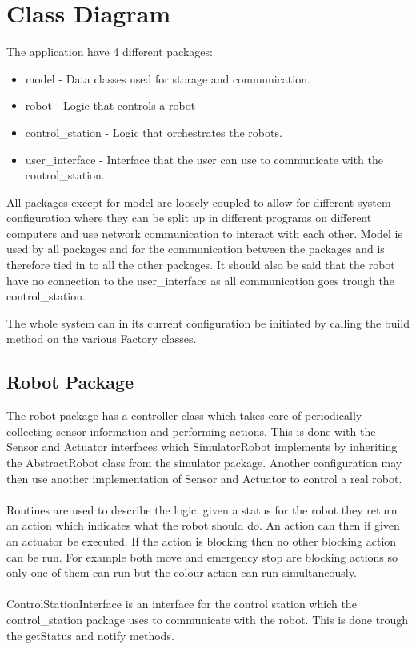 \section{Class Diagram}
The application have 4 different packages:
\begin{itemize}
    \item model - Data classes used for storage and communication.
    \item robot - Logic that controls a robot
    \item control\_station - Logic that orchestrates the robots.
    \item user\_interface - Interface that the user can use to communicate with the control\_station.
\end{itemize}
All packages except for model are loosely coupled to allow for different system configuration where they can be split up in different programs on different computers and use network communication to interact with each other. Model is used by all packages and for the communication between the packages and is therefore tied in to all the other packages. It should also be said that the robot have no connection to the user\_interface as all communication goes trough the control\_station.

The whole system can in its current configuration be initiated by calling the build method on the various Factory classes.

\subsection{Robot Package}
The robot package has a controller class which takes care of periodically collecting sensor information and performing actions. This is done with the Sensor and Actuator interfaces which SimulatorRobot implements by inheriting the AbstractRobot class from the simulator package. Another configuration may then use another implementation of Sensor and Actuator to control a real robot.
\\ \\
Routines are used to describe the logic, given a status for the robot they return an action which indicates what the robot should do. An action can then if given an actuator be executed. If the action is blocking then no other blocking action can be run. For example both move and emergency stop are blocking actions so only one of them can run but the colour action can run simultaneously.
\\ \\
ControlStationInterface is an interface for the control station which the control\_station package uses to communicate with the robot. This is done trough the getStatus and notify methods.

